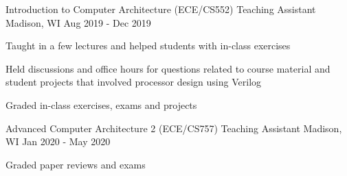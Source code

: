 
\begin{cventries}
  \cventry
    {Introduction to Computer Architecture (ECE/CS552)} %
    {Teaching Assistant} %
    {Madison, WI} %
    {Aug 2019 - Dec 2019} %
    {
      \begin{cvitems} %
        \item {Taught in a few lectures and helped students with in-class exercises}
        \item {Held discussions and office hours for questions related to course material and student projects that involved processor design using Verilog}
        \item {Graded in-class exercises, exams and projects}
      \end{cvitems}
    }
  \cventry
    {Advanced Computer Architecture 2 (ECE/CS757)} %
    {Teaching Assistant} %
    {Madison, WI} %
    {Jan 2020 - May 2020} %
    {
      \begin{cvitems} %
        \item {Graded paper reviews and exams}
      \end{cvitems}
    }
\end{cventries}